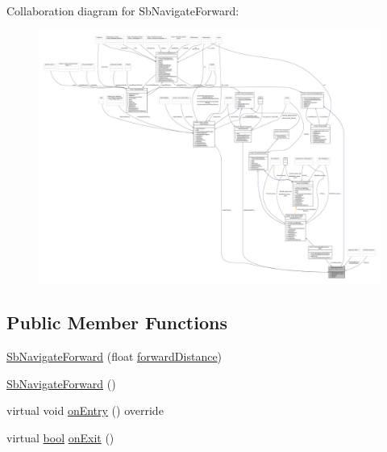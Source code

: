 Collaboration diagram for Sb\+Navigate\+Forward\+:
\nopagebreak
\begin{figure}[H]
\begin{center}
\leavevmode
\includegraphics[width=350pt]{classSbNavigateForward__coll__graph}
\end{center}
\end{figure}
\subsection*{Public Member Functions}
\begin{DoxyCompactItemize}
\item 
\hyperlink{classSbNavigateForward_a151cdb95352703ff9065fd0d34ddcdda}{Sb\+Navigate\+Forward} (float \hyperlink{classSbNavigateForward_adc99629f937c3d43fa56a59ca16f9aee}{forward\+Distance})
\item 
\hyperlink{classSbNavigateForward_a4b6a96bcd0055a5186dbecdc48f8a03b}{Sb\+Navigate\+Forward} ()
\item 
virtual void \hyperlink{classSbNavigateForward_a0e01d850ed0e028f3b9b3704862c7ea5}{on\+Entry} () override
\item 
virtual \hyperlink{classbool}{bool} \hyperlink{classSbNavigateForward_ac16315240c9dd4e5e7f3681455f997cb}{on\+Exit} ()
\end{DoxyCompactItemize}
